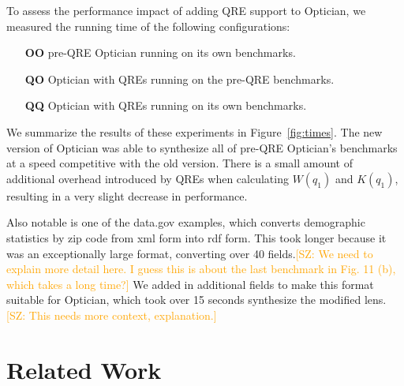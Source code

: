 \documentclass[acmsmall,review,anonymous]{acmart}
\newcommand{\FINISH}[3]{\ifdraft\textcolor{#1}{[#2: #3]}\fi}
\newcommand{\saz}[1]{\FINISH{orange}{SZ}{#1}}
\newcommand{\OpticianRuntime}{\textbf{OO}}
\newcommand{\SystemOnOptician}{\textbf{QO}}
\newcommand{\SystemOnBenchmarks}{\textbf{QQ}}
\begin{document}
To assess the performance impact of adding QRE support to Optician, we measured
the running time of the following configurations:
\begin{itemize}
  \item[\OpticianRuntime{}] pre-QRE Optician running on its own benchmarks.
  \item[\SystemOnOptician{}] Optician with QREs running on the pre-QRE benchmarks.
  \item[\SystemOnBenchmarks{}] Optician with QREs running on its own benchmarks.
\end{itemize}

We summarize the results of these experiments in Figure~\ref{fig:times}.  The
new version of Optician was able to synthesize all of pre-QRE Optician's
benchmarks at a speed competitive with the old version.  There is a small amount
of additional overhead introduced by QREs when calculating $W(q_1)$ and $K(q_1)$,
resulting in a very slight decrease in performance.

Also notable is one of the data.gov examples, which converts demographic
statistics by zip code from xml form into rdf form. This took longer because it
was an exceptionally large format, converting over 40 fields.\saz{We need to
  explain more detail here.  I guess this is about the last benchmark in Fig. 11
  (b), which takes a long time?}  We added in additional fields to make this
format suitable for Optician, which took over 15 seconds synthesize the modified
lens.\saz{This needs more context, explanation.}

\section{Related Work}
\label{relwork}
\end{document}
